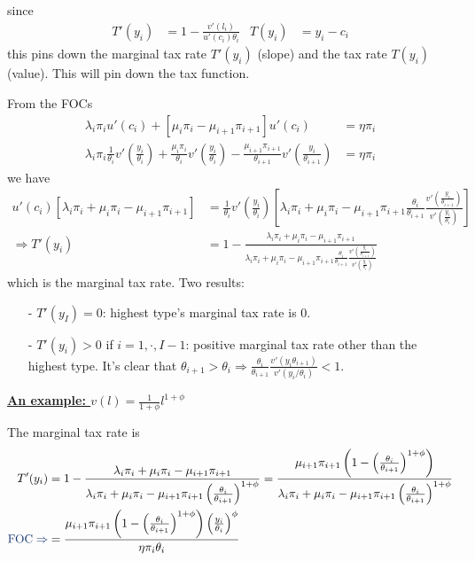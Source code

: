 \documentclass[10pt,landscape,a4paper]{article}
\begin{document}
\begin{multicols*}{3}
since
\begin{align*}
    T'(y_i) &= 1-\frac{v'(l_i)}{u'(c_i)\theta_i} & T(y_i) &= y_i-c_i
\end{align*}
this pins down the marginal tax rate $T'(y_i)$ (slope) and the tax rate $T(y_i)$ (value). This will pin down the tax function.

From the FOCs
\begin{align*}
    \lambda_i \pi_i u'(c_i)+\left[\mu_i\pi_i-\mu_{i+1}\pi_{i+1}\right]u'(c_i) &=\eta\pi_i\\
    \lambda_i\pi_i \frac{1}{\theta_i}v'\left(\frac{y_i}{\theta_i}\right) + \frac{\mu_i\pi_i}{\theta_i}v'\left(\frac{y_i}{\theta_i}\right) - \frac{\mu_{i+1}\pi_{i+1}}{\theta_{i+1}}v'\left(\frac{y_i}{\theta_{i+1}}\right) &=\eta\pi_i
\end{align*}
we have
\begin{align*}
    u'(c_i)[\lambda_i\pi_i+\mu_i\pi_i-\mu_{i+1}\pi_{i+1}] &= \frac{1}{\theta_i}v'\left(\frac{y_i}{\theta_i}\right)\left[\lambda_i\pi_i+\mu_i\pi_i -\mu_{i+1}\pi_{i+1}\frac{\theta_i}{\theta_{i+1}}\frac{v'\left(\frac{y_i}{\theta_{i+1}}\right)}{v'\left(\frac{y_i}{\theta_i}\right)}\right]\\
    \Rightarrow T'(y_i) &= 1-\frac{\lambda_i\pi_i+\mu_i\pi_i-\mu_{i+1}\pi_{i+1}}{\lambda_i\pi_i+\mu_i\pi_i -\mu_{i+1}\pi_{i+1}\frac{\theta_i}{\theta_{i+1}}\frac{v'\left(\frac{y_i}{\theta_{i+1}}\right)}{v'\left(\frac{y_i}{\theta_i}\right)}}
\end{align*}
which is the marginal tax rate. Two results:
\begin{itemize}
    \item[-] $T'(y_I)=0$: highest type's marginal tax rate is 0.
    \item[-] $T'(y_i)>0$ if $i=1,\cdot,I-1$: positive marginal tax rate other than the highest type. It's clear that $\theta_{i+1}>\theta_i \Rightarrow \frac{\theta_i}{\theta_{i+1}}\frac{v'(y_i\theta_{i+1})}{v'(y_i/\theta_i)}<1$.
\end{itemize}

\underline{\textbf{\color{myblue}An example: $v(l)=\frac{1}{1+\phi}l^{1+\phi}$}}

The marginal tax rate is 
\begin{align*}
    T'(y_i) &= 1-\frac{\lambda_i\pi_i+\mu_i\pi_i-\mu_{i+1}\pi_{i+1}}{\lambda_i\pi_i+\mu_i\pi_i -\mu_{i+1}\pi_{i+1}\left(\frac{\theta_i}{\theta_{i+1}}\right)^{1+\phi}} = \frac{\mu_{i+1}\pi_{i+1}\left(1- \left(\frac{\theta_i}{\theta_{i+1}}\right)^{1+\phi}\right)}{\lambda_i\pi_i+\mu_i\pi_i -\mu_{i+1}\pi_{i+1}\left(\frac{\theta_i}{\theta_{i+1}}\right)^{1+\phi}}\\
    {\color{myblue}\text{FOC}\Rightarrow}&= \frac{\mu_{i+1}\pi_{i+1}\left(1- \left(\frac{\theta_i}{\theta_{i+1}}\right)^{1+\phi}\right)\left(\frac{y_i}{\theta_i}\right)^{\phi}}{\eta\pi_i\theta_i} 
\end{align*}


\end{multicols*}
\end{document}
